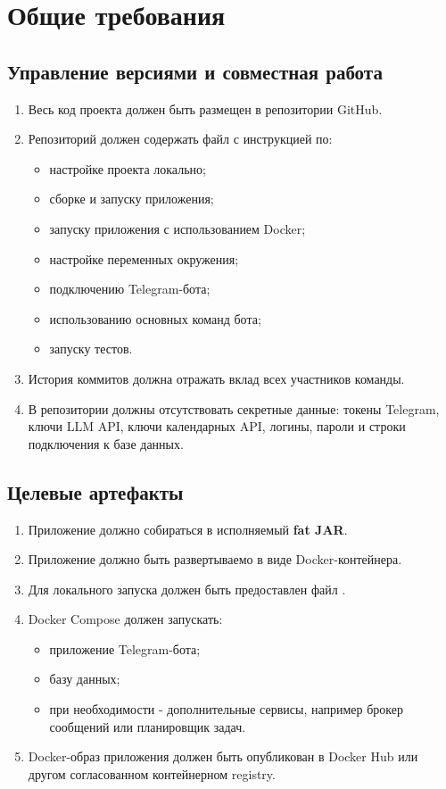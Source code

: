 \documentclass[10pt,a4paper,final]{article} %
\begin{document}
\section{Общие требования}

\subsection{Управление версиями и совместная работа}

\begin{enumerate}[label=\arabic*.]
    \item Весь код проекта должен быть размещен в репозитории GitHub.
    \item Репозиторий должен содержать файл  с инструкцией по:
    \begin{itemize}
        \item настройке проекта локально;
        \item сборке и запуску приложения;
        \item запуску приложения с использованием Docker;
        \item настройке переменных окружения;
        \item подключению Telegram-бота;
        \item использованию основных команд бота;
        \item запуску тестов.
    \end{itemize}
    \item История коммитов должна отражать вклад всех участников команды.
    \item В репозитории должны отсутствовать секретные данные: токены Telegram, ключи LLM API, ключи календарных API, логины, пароли и строки подключения к базе данных.
\end{enumerate}

\subsection{Целевые артефакты}

\begin{enumerate}[label=\arabic*.]
    \item Приложение должно собираться в исполняемый \textbf{fat JAR}.
    \item Приложение должно быть развертываемо в виде Docker-контейнера.
    \item Для локального запуска должен быть предоставлен файл .
    \item Docker Compose должен запускать:
    \begin{itemize}
        \item приложение Telegram-бота;
        \item базу данных;
        \item при необходимости - дополнительные сервисы, например брокер сообщений или планировщик задач.
    \end{itemize}
    \item Docker-образ приложения должен быть опубликован в Docker Hub или другом согласованном контейнерном registry.
\end{enumerate}
\end{document}
